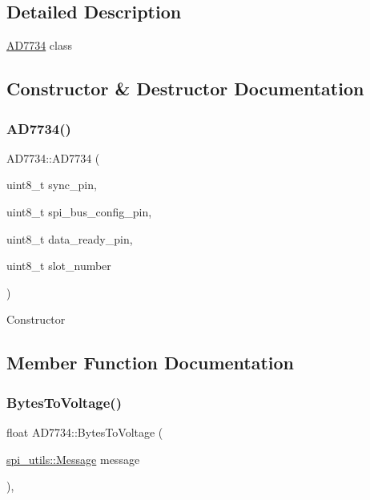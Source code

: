 \subsection{Detailed Description}
\mbox{\hyperlink{classAD7734}{A\+D7734}} class 

\subsection{Constructor \& Destructor Documentation}
\mbox{\label{classAD7734_a2bf3cea4357919fda364b8121cd6af4f}} 
\subsubsection{\texorpdfstring{A\+D7734()}{AD7734()}}
{\footnotesize\ttfamily A\+D7734\+::\+A\+D7734 (\begin{DoxyParamCaption}\item[{uint8\+\_\+t}]{sync\+\_\+pin,  }\item[{uint8\+\_\+t}]{spi\+\_\+bus\+\_\+config\+\_\+pin,  }\item[{uint8\+\_\+t}]{data\+\_\+ready\+\_\+pin,  }\item[{uint8\+\_\+t}]{slot\+\_\+number }\end{DoxyParamCaption})}

Constructor 

\subsection{Member Function Documentation}
\mbox{\label{classAD7734_a76b600d52392dbfe2d053e166af41018}} 
\subsubsection{\texorpdfstring{Bytes\+To\+Voltage()}{BytesToVoltage()}}
{\footnotesize\ttfamily float A\+D7734\+::\+Bytes\+To\+Voltage (\begin{DoxyParamCaption}\item[{\mbox{\hyperlink{structspi__utils_1_1Message}{spi\+\_\+utils\+::\+Message}}}]{message }\end{DoxyParamCaption})\hspace{0.3cm}{\ttfamily [protected]}, {\ttfamily [virtual]}}

